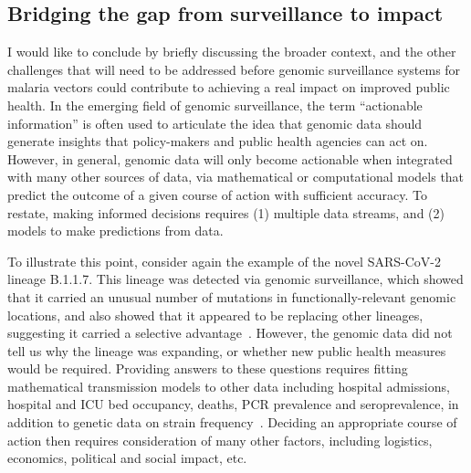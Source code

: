 \begin{refsection}
\section{Bridging the gap from surveillance to impact}\label{sec:discuss-external}


I would like to conclude by briefly discussing the broader context, and the other challenges that will need to be addressed before genomic surveillance systems for malaria vectors could contribute to achieving a real impact on improved public health.
%
In the emerging field of genomic surveillance, the term ``actionable information'' is often used to articulate the idea that genomic data should generate insights that policy-makers and public health agencies can act on.
%
However, in general, genomic data will only become actionable when integrated with many other sources of data, via mathematical or computational models that predict the outcome of a given course of action with sufficient accuracy.
%
To restate, making informed decisions requires (1) multiple data streams, and (2) models to make predictions from data.
%


To illustrate this point, consider again the example of the novel SARS-CoV-2 lineage B.1.1.7.
%
This lineage was detected via genomic surveillance, which showed that it carried an unusual number of mutations in functionally-relevant genomic locations, and also showed that it appeared to be replacing other lineages, suggesting it carried a selective advantage~\parencite{Rambaut2020}.
%
However, the genomic data did not tell us why the lineage was expanding, or whether new public health measures would be required.
%
Providing answers to these questions requires fitting mathematical transmission models to other data including hospital admissions, hospital and ICU bed occupancy, deaths, PCR prevalence and seroprevalence, in addition to genetic data on strain frequency~\parencite{Davies2020}.
%
Deciding an appropriate course of action then requires consideration of many other factors, including logistics, economics, political and social impact, etc.



\end{refsection}
